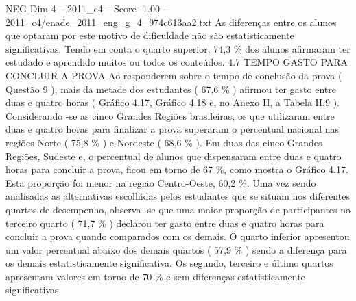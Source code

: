 \begin{textsample}{NEG Dim 4 – 2011\_c4 – Score -1.00 – 2011\_c4/enade\_2011\_eng\_g\_4\_974c613aa2.txt}
As diferenças entre os alunos que optaram por este motivo de dificuldade não são estatisticamente significativas.
Tendo em conta o quarto superior, 74,3 \% dos alunos afirmaram ter estudado e aprendido muitos ou todos os conteúdos. 4.7 TEMPO GASTO PARA CONCLUIR A PROVA Ao responderem sobre o tempo de conclusão da prova ( Questão 9 ), mais da metade dos estudantes ( 67,6 \% ) afirmou ter gasto entre duas e quatro horas ( Gráfico 4.17, Gráfico 4.18 e, no Anexo II, a Tabela II.9 ).
Considerando -se as cinco Grandes Regiões brasileiras, os que utilizaram entre duas e quatro horas para finalizar a prova superaram o percentual nacional nas regiões Norte ( 75,8 \% ) e Nordeste ( 68,6 \% ).
Em duas das cinco Grandes Regiões, Sudeste e, o percentual de alunos que dispensaram entre duas e quatro horas para concluir a prova, ficou em torno de 67 \%, como mostra o Gráfico 4.17.
Esta proporção foi menor na região Centro-Oeste, 60,2 \%.
Uma vez sendo analisadas as alternativas escolhidas pelos estudantes que se situam nos diferentes quartos de desempenho, observa -se que uma maior proporção de participantes no terceiro quarto ( 71,7 \% ) declarou ter gasto entre duas e quatro horas para concluir a prova quando comparados com os demais.
O quarto inferior apresentou um valor percentual abaixo dos demais quartos ( 57,9 \% ) sendo a diferença para os demais estatisticamente significativa.
Os segundo, terceiro e último quartos apresentam valores em torno de 70 \% e sem diferenças estatisticamente significativas.

\end{textsample}
